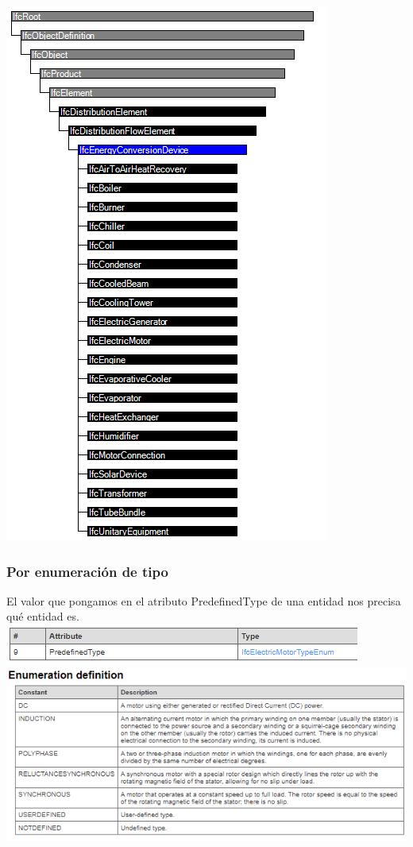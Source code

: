 \documentclass[spanish,10pt,a4paper,final,oneside]{article}
\begin{document}
\includegraphics[scale=0.6]{ifcenergyconversiondevice}

\subsubsection{Por enumeración de tipo}
El valor que pongamos en el atributo PredefinedType de una entidad nos precisa qué entidad es.
\\ \includegraphics[scale=1.1]{atributo PredefinedType para un IfcElectricMotor} 
\\ \includegraphics[scale=1]{enumeracion IfcElectricMotorTypeEnum}
\end{document}
